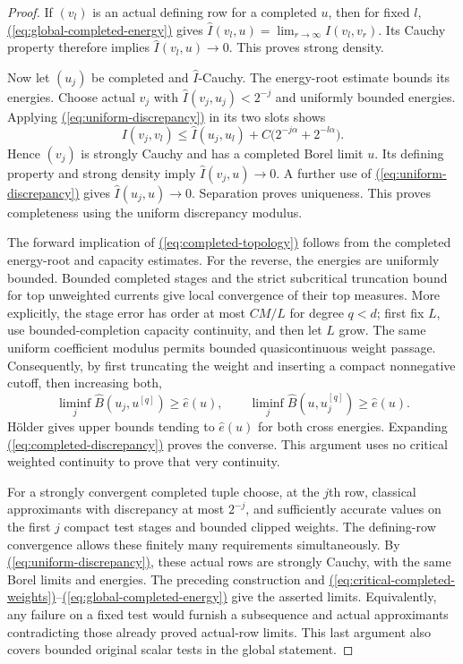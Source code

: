 \documentclass[11pt,reqno]{amsart}
\theoremstyle{definition}
\theoremstyle{remark}
\numberwithin{equation}{section}
\newcommand{\MathEqref}[1]{\begingroup\hypersetup{linkcolor=EquationLink}\hyperref[#1]{(\ref*{#1})}\endgroup}
\begin{document}
\begin{proof}
If $(v_l)$ is an actual defining row for a completed $u$, then
for fixed $l$, \MathEqref{eq:global-completed-energy} gives
$\widehat I(v_l,u)=\lim_{r\to\infty}I(v_l,v_r)$.
Its Cauchy property therefore implies
$\widehat I(v_l,u)\to0$. This proves strong density.

Now let $(u_j)$ be completed and $\widehat I$-Cauchy.
The energy-root estimate bounds its energies. Choose actual
$v_j$ with $\widehat I(v_j,u_j)<2^{-j}$ and uniformly bounded
energies. Applying \MathEqref{eq:uniform-discrepancy} in its two slots shows
\begin{equation}\label{eq:diagonal-cauchy}
 I(v_j,v_l)\leq\widehat I(u_j,u_l)
                   +C\bigl(2^{-j\alpha}+2^{-l\alpha}\bigr).
\end{equation}
Hence $(v_j)$ is strongly Cauchy and has a completed Borel
limit $u$. Its defining property and strong density imply
$\widehat I(v_j,u)\to0$. A further use of \MathEqref{eq:uniform-discrepancy} gives
$\widehat I(u_j,u)\to0$. Separation proves uniqueness.
This proves completeness using the uniform discrepancy modulus.

The forward implication of \MathEqref{eq:completed-topology} follows from the completed
energy-root and capacity estimates. For the reverse, the
energies are uniformly bounded. Bounded completed stages and
the strict subcritical truncation bound for top unweighted
currents give local convergence of their top measures. More
explicitly, the stage error has order at most $C M/L$ for
degree $q<d$; first fix $L$, use bounded-completion capacity
continuity, and then let $L$ grow. The same uniform coefficient
modulus permits bounded quasicontinuous weight passage.
Consequently, by first truncating the weight and inserting a
compact nonnegative cutoff, then increasing both,
\begin{equation}\label{eq:cross-energy-liminf}
 \liminf_j\widehat B(u_j,u^{[q]})\geq\widehat e(u),\qquad
 \liminf_j\widehat B(u,u_j^{[q]})\geq\widehat e(u).
\end{equation}
H\"older gives upper bounds tending to $\widehat e(u)$ for
both cross energies. Expanding \MathEqref{eq:completed-discrepancy} proves the converse.
This argument uses no critical weighted continuity to prove
that very continuity.

For a strongly convergent completed tuple choose, at the $j$th
row, classical approximants with discrepancy at most $2^{-j}$,
and sufficiently accurate values on the first $j$ compact
test stages and bounded clipped weights. The defining-row
convergence allows these finitely many requirements
simultaneously. By \MathEqref{eq:uniform-discrepancy}, these actual rows are strongly
Cauchy, with the same Borel limits and energies. The preceding
construction and \MathEqref{eq:critical-completed-weights}--\MathEqref{eq:global-completed-energy} give the asserted limits.
Equivalently, any failure on a fixed test would furnish a
subsequence and actual approximants contradicting those
already proved actual-row limits. This last argument also
covers bounded original scalar tests in the global statement.

\end{proof}
\end{document}
